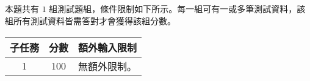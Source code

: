 \subsection*{}

\begin{tests}

\end{tests}

\subsection*{}

本題共有 $1$ 組測試題組，條件限制如下所示。每一組可有一或多筆測試資料，該組所有測試資料皆需答對才會獲得該組分數。

\begin{center}
    \begin{tabular}[t]{@{}ccl@{}}
    \toprule
    子任務 & 分數 & 額外輸入限制\\
    \midrule
    1 & 100 & 無額外限制。\\
    \bottomrule
    \end{tabular}
\end{center}


